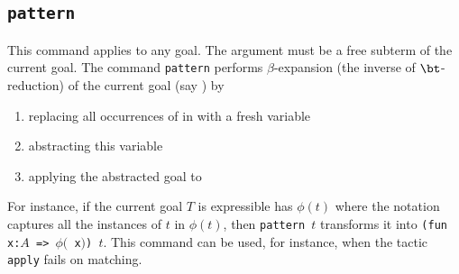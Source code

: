 \begin{coq_example*}
\subsection{{\tt pattern {\term}}
\label{pattern}}

This command applies to any goal. The argument {\term} must be a free
subterm of the current goal.  The command {\tt pattern} performs
$\beta$-expansion (the inverse of $\bt$-reduction) of the current goal
(say \T) by
\begin{enumerate}
\item replacing all occurrences of {\term} in {\T} with a fresh variable
\item abstracting this variable
\item applying the abstracted goal to {\term}
\end{enumerate}

For instance, if the current goal $T$ is expressible has $\phi(t)$
where the notation captures all the instances of $t$ in $\phi(t)$,
then {\tt pattern $t$} transforms it into {\tt (fun x:$A$ => $\phi(${\tt
x}$)$) $t$}.  This command can be used, for instance, when the tactic
{\tt apply} fails on matching.

\end{coq_example*}
